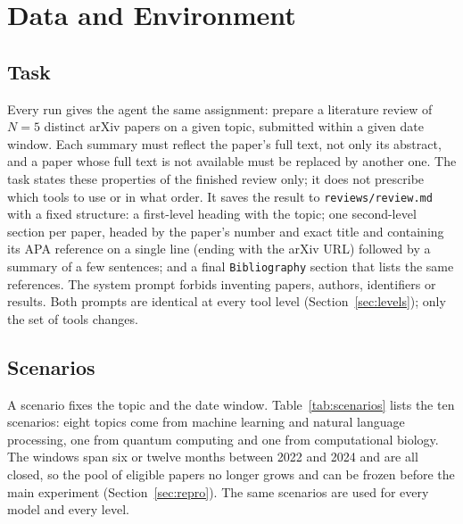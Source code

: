 \section{Data and Environment}
\label{sec:data}

\subsection{Task}
\label{sec:task}

Every run gives the agent the same assignment: prepare a literature review of $N=5$ distinct arXiv papers on a given topic, submitted within a given date window. Each summary must reflect the paper's full text, not only its abstract, and a paper whose full text is not available must be replaced by another one. The task states these properties of the finished review only; it does not prescribe which tools to use or in what order. It saves the result to \texttt{reviews/review.md} with a fixed structure: a first-level heading with the topic; one second-level section per paper, headed by the paper's number and exact title and containing its APA reference on a single line (ending with the arXiv URL) followed by a summary of a few sentences; and a final \texttt{Bibliography} section that lists the same references. The system prompt forbids inventing papers, authors, identifiers or results. Both prompts are identical at every tool level (Section~\ref{sec:levels}); only the set of tools changes.

\subsection{Scenarios}
\label{sec:scenarios}

A scenario fixes the topic and the date window. Table~\ref{tab:scenarios} lists the ten scenarios: eight topics come from machine learning and natural language processing, one from quantum computing and one from computational biology. The windows span six or twelve months between 2022 and 2024 and are all closed, so the pool of eligible papers no longer grows and can be frozen before the main experiment (Section~\ref{sec:repro}). The same scenarios are used for every model and every level.

